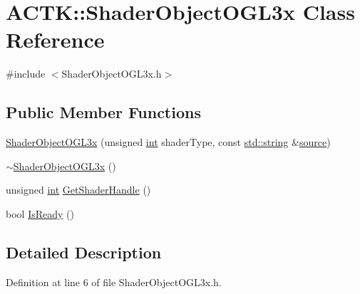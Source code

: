 \hypertarget{class_a_c_t_k_1_1_shader_object_o_g_l3x}{\section{A\-C\-T\-K\-:\-:Shader\-Object\-O\-G\-L3x Class Reference}
\label{class_a_c_t_k_1_1_shader_object_o_g_l3x}
}


{\ttfamily \#include $<$Shader\-Object\-O\-G\-L3x.\-h$>$}

\subsection*{Public Member Functions}
\begin{DoxyCompactItemize}
\item 
\hyperlink{class_a_c_t_k_1_1_shader_object_o_g_l3x_ae1f28ef71e0786c05af9bf132ba6387a}{Shader\-Object\-O\-G\-L3x} (unsigned \hyperlink{wglew_8h_a500a82aecba06f4550f6849b8099ca21}{int} shader\-Type, const \hyperlink{glew_8h_ae9ea2d206f76ea82db7a2ea002fdef2f}{std\-::string} \&\hyperlink{glew_8h_afdd0f0e67e302eefcb4f6b23732e7ea3}{source})
\item 
\hyperlink{class_a_c_t_k_1_1_shader_object_o_g_l3x_a2979fce0eb3c603f7303b1b65e48bd94}{$\sim$\-Shader\-Object\-O\-G\-L3x} ()
\item 
unsigned \hyperlink{wglew_8h_a500a82aecba06f4550f6849b8099ca21}{int} \hyperlink{class_a_c_t_k_1_1_shader_object_o_g_l3x_ad714b41ba123f71f3e1a03fa0de15058}{Get\-Shader\-Handle} ()
\item 
bool \hyperlink{class_a_c_t_k_1_1_shader_object_o_g_l3x_a733647df9cbabc20fc4c5a70e270f2d9}{Is\-Ready} ()
\end{DoxyCompactItemize}


\subsection{Detailed Description}


Definition at line 6 of file Shader\-Object\-O\-G\-L3x.\-h.



